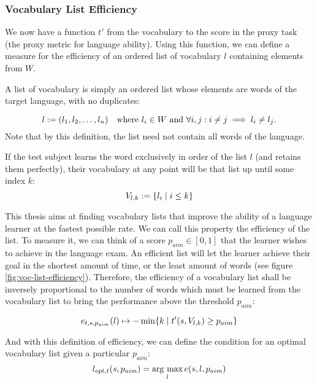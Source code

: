 \subsubsection{Vocabulary List Efficiency}
We now have a function $t'$ from the vocabulary to the score in the proxy task (the proxy metric for language ability).
Using this function, we can define a measure for the efficiency of an ordered list of vocabulary $l$ containing elements from $W$.

A list of vocabulary is simply an ordered list whose elements are words of the target language, with no duplicates:

\begin{equation*}
	l        := (l_1, l_2, \dots, l_n) \quad \text{where } l_i \in W \text{ and } \forall i,j: i \neq j \implies l_i \neq l_j . \\
\end{equation*}
Note that by this definition, the list need not contain all words of the language.

If the test subject learns the word exclusively in order of the list $l$ (and retains them perfectly), their vocabulary at any point will be that list up until some index $k$:
\begin{equation*}
	V_{l, k} := \{l_i \mid i \leq k\}                                                                                 \\
\end{equation*}


This thesis aims at finding vocabulary lists that improve the ability of a language learner at the fastest possible rate.
We can call this property the efficiency of the list.
To measure it, we can think of a score $p_{aim} \in [0, 1]$ that the learner wishes to achieve in the language exam.
An efficient list will let the learner achieve their goal in the shortest amount of time, or the least amount of words (see figure \ref{fig:voc-list-efficiency}).
Therefore, the efficiency of a vocabulary list shall be inversely proportional to the number of words which must be learned from the vocabulary list to bring the performance above the threshold $p_{aim}$:

\begin{equation}
	e_{t, s, p_{aim}}(l) \mapsto -  \min\{ k \mid  t'(s,  V_{l, k}) \geq p_{aim} \} \\
\end{equation}

And with this definition of efficiency, we can define the condition for an optimal vocabulary list given a particular $p_{aim}$:
\begin{equation} \label{eq:optimal-vocab-list}
	l_{opt, t} (s, p_{aim}) = \mathop{\rm arg~max}\limits_{l} e(s, l, p_{aim})
\end{equation}

